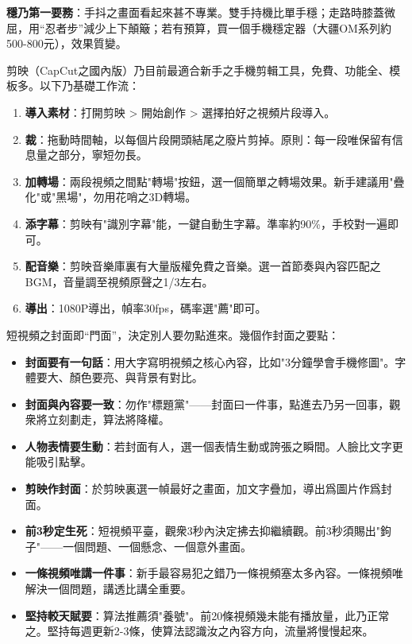 \textbf{穩乃第一要務}：手抖之畫面看起來甚不專業。雙手持機比單手穩；走路時膝蓋微屈，用“忍者步”減少上下顛簸；若有預算，買一個手機穩定器（大疆OM系列約500-800元），效果質變。


剪映（CapCut之國內版）乃目前最適合新手之手機剪輯工具，免費、功能全、模板多。以下乃基礎工作流：

\begin{enumerate}
  \item \textbf{導入素材}：打開剪映 > 開始創作 > 選擇拍好之視頻片段導入。
  \item \textbf{裁}：拖動時間軸，以每個片段開頭結尾之廢片剪掉。原則：每一段唯保留有信息量之部分，寧短勿長。
  \item \textbf{加轉場}：兩段視頻之間點"轉場"按鈕，選一個簡單之轉場效果。新手建議用"疊化"或"黑場"，勿用花哨之3D轉場。
  \item \textbf{添字幕}：剪映有"識別字幕"能，一鍵自動生字幕。準率約90\%，手校對一遍即可。
  \item \textbf{配音樂}：剪映音樂庫裏有大量版權免費之音樂。選一首節奏與內容匹配之BGM，音量調至視頻原聲之1/3左右。
  \item \textbf{導出}：1080P導出，幀率30fps，碼率選"薦"即可。
\end{enumerate}


短視頻之封面即“門面”，決定別人要勿點進來。幾個作封面之要點：

\begin{itemize}
  \item \textbf{封面要有一句話}：用大字寫明視頻之核心內容，比如"3分鐘學會手機修圖"。字體要大、顏色要亮、與背景有對比。
  \item \textbf{封面與內容要一致}：勿作"標題黨"——封面曰一件事，點進去乃另一回事，觀衆將立刻劃走，算法將降權。
  \item \textbf{人物表情要生動}：若封面有人，選一個表情生動或誇張之瞬間。人臉比文字更能吸引點擊。
  \item \textbf{剪映作封面}：於剪映裏選一幀最好之畫面，加文字疊加，導出爲圖片作爲封面。
\end{itemize}


\begin{itemize}
  \item \textbf{前3秒定生死}：短視頻平臺，觀衆3秒內決定拂去抑繼續觀。前3秒須賜出"鉤子"——一個問題、一個懸念、一個意外畫面。
  \item \textbf{一條視頻唯講一件事}：新手最容易犯之錯乃一條視頻塞太多內容。一條視頻唯解決一個問題，講透比講全重要。
  \item \textbf{堅持較天賦要}：算法推薦須"養號"。前20條視頻幾未能有播放量，此乃正常之。堅持每週更新2-3條，使算法認識汝之內容方向，流量將慢慢起來。
\end{itemize}

